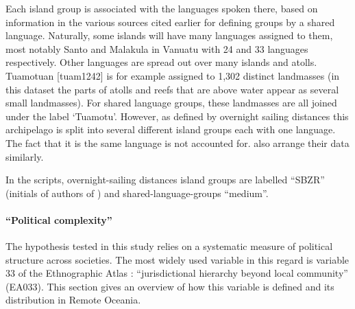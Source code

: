 \documentclass[unnumsec,webpdf,modern,medium]{oup-authoring-template}
\begin{document}

Each island group is associated with the languages spoken there, based on information in the various sources cited earlier for defining groups by a shared language. Naturally, some islands will have many languages assigned to them, most notably Santo and Malakula in Vanuatu with 24 and 33 languages respectively. Other languages are spread out over many islands and atolls. Tuamotuan [tuam1242] is for example assigned to 1,302 distinct landmasses (in this dataset the parts of atolls and reefs that are above water appear as several small landmasses). For shared language groups, these landmasses are all joined under the label `Tuamotu'. However, as defined by overnight sailing distances this archipelago is split into several different island groups each with one language. The fact that it is the same language is not accounted for. \citet{gavin2012island} also arrange their data similarly.

In the scripts, overnight-sailing distances island groups are labelled ``SBZR'' (initials of authors of \cite{NZSA_overnight_2023}) and shared-language-groups ``medium''.

\FloatBarrier
\paragraph{``Political complexity''}
\label{appendix_def_pol_complex}
The hypothesis tested in this study relies on a systematic measure of political structure across societies. The most widely used variable in this regard is variable 33 of the Ethnographic Atlas \citep{EA_1971}: ``jurisdictional hierarchy beyond local community'' (EA033). This section gives an overview of how this variable is defined and its distribution in Remote Oceania. 
\end{document}
